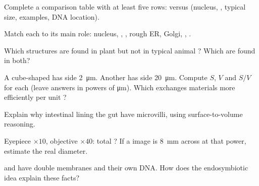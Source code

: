 \begin{exercise}[$\star$]\label{exo:g10:the-cell:2}
Complete a comparison table with at least five rows:  versus
 (nucleus, , typical size, examples, DNA location).
\end{exercise}

\begin{exercise}[$\star$]\label{exo:g10:the-cell:3}
Match each  to its main role: nucleus, ,
, rough ER, Golgi, , .
\end{exercise}

\begin{exercise}[$\star$]\label{exo:g10:the-cell:4}
Which structures are found in plant  but not in typical animal
? Which are found in both?
\end{exercise}

\begin{exercise}[$\star$]\label{exo:g10:the-cell:5}
A cube-shaped  has side \qty{2}{\micro m}. Another has side
\qty{20}{\micro m}. Compute $S$, $V$ and $S/V$ for each (leave answers
in powers of \unit{\micro m}). Which exchanges materials more
efficiently per unit ?
\end{exercise}

\begin{exercise}[$\star\star$]\label{exo:g10:the-cell:6}
Explain why intestinal  lining the gut have microvilli, using
surface-to-volume reasoning.
\end{exercise}

\begin{exercise}[$\star\star$]\label{exo:g10:the-cell:7}
Eyepiece $\times 10$, objective $\times 40$: total ?
If a  image is \qty{8}{mm} across at that power, estimate the real
 diameter.
\end{exercise}

\begin{exercise}[$\star\star$]\label{exo:g10:the-cell:8}
 and  have double membranes and their own DNA.
How does the endosymbiotic idea explain these facts?
\end{exercise}

